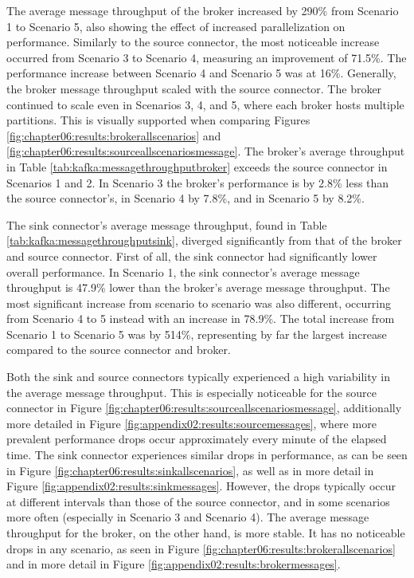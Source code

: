 The average message throughput of the broker increased by 290\% from Scenario 1 to Scenario 5, also showing the effect of increased parallelization on performance. Similarly to the source connector, the most noticeable increase occurred from Scenario 3 to Scenario 4, measuring an improvement of 71.5\%. The performance increase between Scenario 4 and Scenario 5 was at 16\%. Generally, the broker message throughput scaled with the source connector. The broker continued to scale even in Scenarios 3, 4, and 5, where each broker hosts multiple partitions. This is visually supported when comparing Figures \ref{fig:chapter06:results:brokerallscenarios} and \ref{fig:chapter06:results:sourceallscenariosmessage}. The broker's average throughput in Table \ref{tab:kafka:messagethroughputbroker} exceeds the source connector in Scenarios 1 and 2. In Scenario 3 the broker's performance is by 2.8\% less than the source connector's, in Scenario 4 by 7.8\%, and in Scenario 5 by 8.2\%.

The sink connector's average message throughput, found in Table \ref{tab:kafka:messagethroughputsink}, diverged significantly from that of the broker and source connector. First of all, the sink connector had significantly lower overall performance. In Scenario 1, the sink connector's average message throughput is 47.9\% lower than the broker's average message throughput. The most significant increase from scenario to scenario was also different, occurring from Scenario 4 to 5 instead with an increase in 78.9\%. The total increase from Scenario 1 to Scenario 5 was by 514\%, representing by far the largest increase compared to the source connector and broker. 

Both the sink and source connectors typically experienced a high variability in the average message throughput. This is especially noticeable for the source connector in Figure \ref{fig:chapter06:results:sourceallscenariosmessage}, additionally more detailed in Figure \ref{fig:appendix02:results:sourcemessages}, where more prevalent performance drops occur approximately every minute of the elapsed time. The sink connector experiences similar drops in performance, as can be seen in Figure \ref{fig:chapter06:results:sinkallscenarios}, as well as in more detail in Figure \ref{fig:appendix02:results:sinkmessages}. However, the drops typically occur at different intervals than those of the source connector, and in some scenarios more often (especially in Scenario 3 and Scenario 4). The average message throughput for the broker, on the other hand, is more stable. It has no noticeable drops in any scenario, as seen in Figure \ref{fig:chapter06:results:brokerallscenarios} and in more detail in Figure \ref{fig:appendix02:results:brokermessages}.

